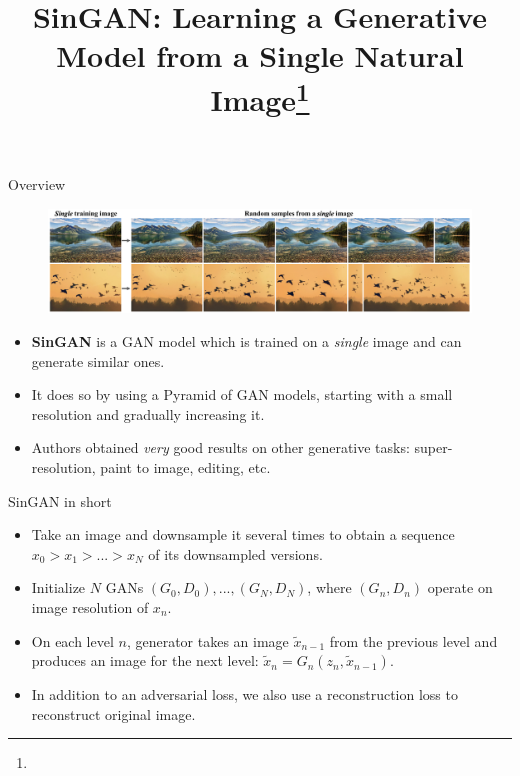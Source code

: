 \documentclass[handout, 10pt]{beamer}
\title{SinGAN: Learning a Generative Model from a Single Natural Image\footnote{\citepaper{SinGAN}}}
\begin{document}
\begin{frame}
    \titlepage
\end{frame}

\begin{frame}{Overview}
    \begin{figure}
        \centering
        \includegraphics[width=\textwidth]{images/singan-main-samples.png}
    \end{figure}
    
    \begin{itemize}
        \item\pause \textbf{SinGAN} is a GAN model which is trained on a \textit{single} image and can generate similar ones.
        \item\pause It does so by using a Pyramid of GAN models, starting with a small resolution and gradually increasing it.
        \item\pause Authors obtained \textit{very} good results on other generative tasks: super-resolution, paint to image, editing, etc.
    \end{itemize}
\end{frame}

\begin{frame}{SinGAN in short}

\begin{itemize}
    \item\pause Take an image and downsample it several times to obtain a sequence $x_0 > x_1 > ... > x_N$ of its downsampled versions.
    \item\pause Initialize $N$ GANs $(G_0, D_0), ..., (G_N, D_N)$, where $(G_n, D_n)$ operate on image resolution of $x_n$.
    \item\pause On each level $n$, generator takes an image $\tilde x_{n-1}$ from the previous level and produces an image for the next level: $\tilde x_n = G_n(z_n, \tilde x_{n-1})$.
    \item\pause In addition to an adversarial loss, we also use a reconstruction loss to reconstruct original image.
\end{itemize}

\end{frame}
\end{document}

